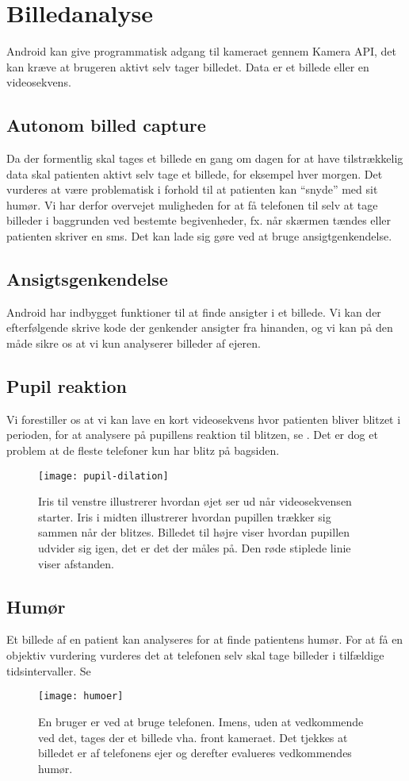 \section{Billedanalyse}
Android kan give programmatisk adgang til kameraet gennem Kamera API, det kan kræve at brugeren aktivt selv tager billedet. Data er et billede eller en videosekvens.

\subsection{Autonom billed capture}
Da der formentlig skal tages et billede en gang om dagen for at have tilstrækkelig data skal patienten aktivt selv tage et billede, for eksempel hver morgen.
Det vurderes at være problematisk i forhold til at patienten kan ``snyde'' med sit humør.
Vi har derfor overvejet muligheden for at få telefonen til selv at tage billeder i baggrunden ved bestemte begivenheder, fx. når skærmen tændes eller patienten skriver en sms.
Det kan lade sig gøre ved at bruge ansigtgenkendelse.

\subsection{Ansigtsgenkendelse}
Android har indbygget funktioner til at finde ansigter i et billede. 
Vi kan der efterfølgende skrive kode der genkender ansigter fra hinanden, og vi kan på den måde sikre os at vi kun analyserer billeder af ejeren.%

\subsection{Pupil reaktion}
Vi forestiller os at vi kan lave en kort videosekvens hvor patienten bliver blitzet i perioden, for at analysere på pupillens reaktion til blitzen, se \cite{hoeks1993pupillary}.
Det er dog et problem at de fleste telefoner kun har blitz på bagsiden.
\begin{figure}
	\centering
\texttt{[image: pupil-dilation]}
\caption{Iris til venstre illustrerer hvordan øjet ser ud når videosekvensen starter. Iris i midten illustrerer hvordan pupillen trækker sig sammen når der blitzes. Billedet til højre viser hvordan pupillen udvider sig igen, det er det der måles på. Den røde stiplede linie viser afstanden.}
\end{figure}

\subsection{Humør}

Et billede af en patient kan analyseres for at finde patientens humør. 
For at få en objektiv vurdering vurderes det at telefonen selv skal tage billeder i tilfældige tidsintervaller. 
Se \cite{kulkarni2009facial}
\begin{figure}
	\centering
\texttt{[image: humoer]}
\caption{En bruger er ved at bruge telefonen. Imens, uden at vedkommende ved det, tages der et billede vha. front kameraet. Det tjekkes at billedet er af telefonens ejer og derefter evalueres vedkommendes humør.}
\end{figure}
